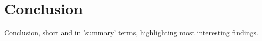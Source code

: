 \section{Conclusion}
\label{sec:conclusion}
Conclusion, short and in 'summary' terms, highlighting most interesting findings.